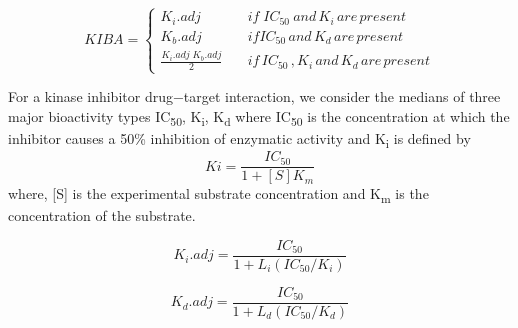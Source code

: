 \begin{flushright}
\begin{equation}
  KIBA = \begin{cases}
    K_i . {adj} & \quad {if} \; {IC_{50}\: and\, K_i \,are\, present} \\
    K_b.{adj} & \quad {if}  {IC_{50} \, and \, K_d \, are \, present} \\
    \frac{K_i . {adj} \; K_b.{adj}}{2} & \quad {if\, IC_{50}\,,K_i\, and \,K_d\, are\, present}
  \end{cases}
   \label{eq:kiba}
\end{equation}
\end{flushright}


For a kinase inhibitor drug−target interaction, we consider the medians of three major bioactivity types IC\textsubscript{50}, K\textsubscript{i}, K\textsubscript{d} where
IC\textsubscript{50} \cite{Tang2013} is the concentration at which the inhibitor causes a 50\% inhibition of enzymatic activity and K\textsubscript{i} is defined by \begin{equation}
    Ki = \frac{IC_{50}} {1 + [S]  K_m}
    \label{eq:ki}
\end{equation} 
where,  [{S}] is the experimental substrate concentration and K\textsubscript{m} is the concentration of the substrate.

\begin{equation}
K_i.{adj} = \frac{IC_{50}}{1 + L_i(IC_{50}/K_i)}
\label{eq:ki_adj}
\end{equation}

\begin{equation}
K_d.{adj} = \frac{IC_{50}}{1 + L_d(IC_{50}/K_d)}
\end{equation}

